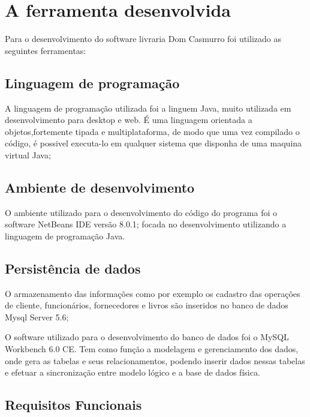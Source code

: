 \chapter{A ferramenta desenvolvida}

	Para o desenvolvimento do software livraria Dom Casmurro foi utilizado as seguintes ferramentas:


\section{Linguagem de programação}
 A linguagem de programação utilizada foi a linguem Java, muito utilizada em desenvolvimento para desktop e web. É uma linguagem orientada a objetos,fortemente tipada e multiplataforma, de modo que uma vez compilado o código, é possivel executa-lo em qualquer sistema que disponha de uma maquina virtual Java;

\section{Ambiente de desenvolvimento}
 O ambiente utilizado para o desenvolvimento do código do programa foi o software NetBeans IDE versão 8.0.1; focada no desenvolvimento utilizando a linguagem de programação Java.

\section{Persistência de dados}
 O armazenamento das informações como por exemplo os cadastro das operações de cliente, funcionários, fornecedores e livros são inseridos no banco de dados Mysql Server 5.6;

O software utilizado para o desenvolvimento do banco de dados foi o MySQL Workbench 6.0 CE. Tem como função a modelagem e gerenciamento dos dados, onde gera as tabelas e seus relacionamentos, podendo inserir dados nessas tabelas e efetuar a sincronização entre modelo lógico e a base de dados física.


\section{Requisitos Funcionais}

